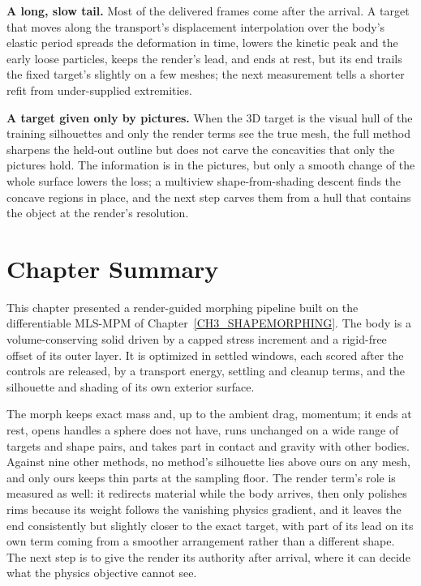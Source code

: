\textbf{A long, slow tail.} Most of the delivered frames come after the arrival. A target that moves along the transport's
displacement interpolation over the body's elastic period spreads the deformation in time, lowers the kinetic peak and the
early loose particles, keeps the render's lead, and ends at rest, but its end trails the fixed target's slightly on a few
meshes; the next measurement tells a shorter refit from under-supplied extremities.

\textbf{A target given only by pictures.} When the 3D target is the visual hull of the training silhouettes and only the
render terms see the true mesh, the full method sharpens the held-out outline but does not carve the concavities that only
the pictures hold. The information is in the pictures, but only a smooth change of the whole surface lowers the loss; a
multiview shape-from-shading descent finds the concave regions in place, and the next step carves them from a hull that
contains the object at the render's resolution.

\section{Chapter Summary}
\label{ch4:sec_summary}

This chapter presented a render-guided morphing pipeline built on the differentiable MLS-MPM of
Chapter~\ref{CH3_SHAPEMORPHING}. The body is a volume-conserving solid driven by a capped stress increment and a rigid-free
offset of its outer layer. It is optimized in settled windows, each scored after the controls are released, by a
transport energy, settling and cleanup terms, and the silhouette and shading of its own exterior surface.

The morph keeps exact mass and, up to the ambient drag, momentum; it ends at rest, opens handles a sphere does not have,
runs unchanged on a wide range of targets and shape pairs, and takes part in contact and gravity with other bodies. Against
nine other methods, no method's silhouette lies above ours on any mesh, and only ours keeps thin parts at the sampling
floor. The render term's role is measured as well: it redirects material while the body arrives, then only polishes rims
because its weight follows the vanishing physics gradient, and it leaves the end consistently but slightly closer to the
exact target, with part of its lead on its own term coming from a smoother arrangement rather than a different shape. The
next step is to give the render its authority after arrival, where it can decide what the physics objective cannot see.

